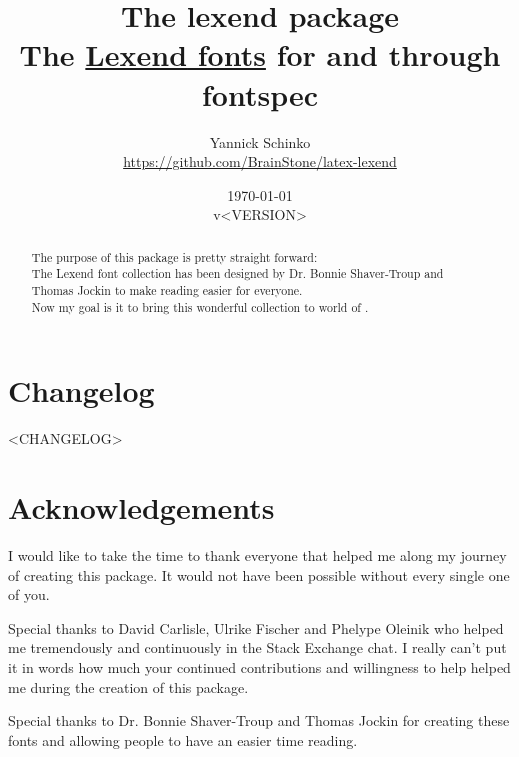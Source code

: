 \documentclass[oneside,a4paper]{l3doc}
\begin{document}
\title{
	The \textsf{lexend} package\\
	\large{The \href{https://www.lexend.com/}{\textsf{Lexend} fonts} for  and
	 through \textsf{fontspec}}
}
\author{
	Yannick Schinko\\
	\texorpdfstring{\url{https://github.com/BrainStone/latex-lexend}}{}
}
\date{
	\today\\
	v<VERSION>
}

\maketitle

\bigskip

\begin{abstract}
The purpose of this package is pretty straight forward:\\
The Lexend font collection has been designed by Dr. Bonnie Shaver-Troup and Thomas Jockin to make
reading easier for everyone.\\
Now my goal is it to bring this wonderful collection to world of .
\end{abstract}

\bigskip
\tableofcontents
\newpage


\section{Changelog}

<CHANGELOG>

\section{Acknowledgements}

I would like to take the time to thank everyone that helped me along my journey of creating this
package. It would not have been possible without every single one of you.

Special thanks to David Carlisle, Ulrike Fischer and Phelype Oleinik who helped me tremendously and
continuously in the  Stack Exchange chat. I really can't put it in words how much your
continued contributions and willingness to help helped me during the creation of this package.

Special thanks to Dr. Bonnie Shaver-Troup and Thomas Jockin for creating these fonts and allowing
people to have an easier time reading.
\end{document}
